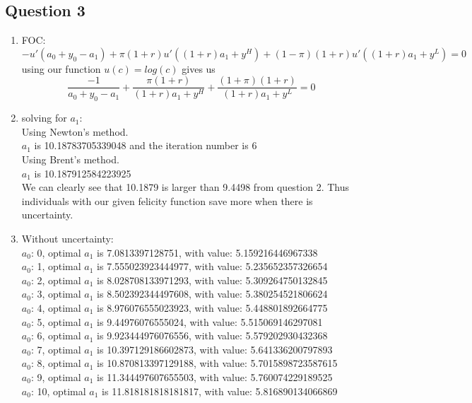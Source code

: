 \documentclass[12pt]{article}
\begin{document}
\subsection*{Question 3}
\begin{enumerate}
	\item FOC: 
		$$-u'(a_0 + y_0 - a_1) + \pi (1+r)u'((1+r)a_1 + y^{H}) + (1-\pi)(1+r)u'((1+r)a_1 + y^{L}) = 0$$
		using our function $u(c) = log(c)$ gives us 
		$$\frac{-1}{a_0 + y_0 - a_1} + \frac{\pi (1+r)}{(1+r)a_1 + y^{H}} + \frac{(1+\pi)(1+r)}{(1+r)a_1 + y^{L}} = 0$$

	\item solving for $a_1$:
\\		Using Newton's method.
\\$a_1$ is 10.18783705339048 and the iteration number is 6
\\Using Brent's method.
\\$a_1$ is 10.187912584223925
\\ We can clearly see that 10.1879 is larger than 9.4498 from question 2. Thus individuals with our given felicity function save more when there is uncertainty.

\item Without uncertainty:
\\$a_0$: 0, optimal $a_1$ is 7.0813397128751, with value: 5.159216446967338
\\$a_0$: 1, optimal $a_1$ is 7.555023923444977, with value: 5.235652357326654
\\$a_0$: 2, optimal $a_1$ is 8.028708133971293, with value: 5.309264750132845
\\$a_0$: 3, optimal $a_1$ is 8.502392344497608, with value: 5.380254521806624
\\$a_0$: 4, optimal $a_1$ is 8.976076555023923, with value: 5.448801892664775
\\$a_0$: 5, optimal $a_1$ is 9.44976076555024, with value: 5.515069146297081
\\$a_0$: 6, optimal $a_1$ is 9.923444976076556, with value: 5.579202930432368
\\$a_0$: 7, optimal $a_1$ is 10.397129186602873, with value: 5.641336200797893
\\$a_0$: 8, optimal $a_1$ is 10.870813397129188, with value: 5.7015898723587615
\\$a_0$: 9, optimal $a_1$ is 11.344497607655503, with value: 5.760074229189525
\\$a_0$: 10, optimal $a_1$ is 11.818181818181817, with value: 5.816890134066869


\end{enumerate}
\end{document}
